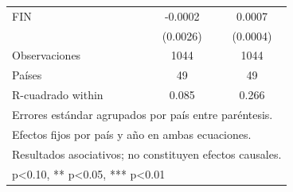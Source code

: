{\begin{tabular}{l*{2}{c}}
\addlinespace
FIN                 &     -0.0002         &      0.0007\sym{*}  \\
                    &    (0.0026)         &    (0.0004)         \\
\midrule
Observaciones       &        1044         &        1044         \\
Países              &          49         &          49         \\
R-cuadrado within   &       0.085         &       0.266         \\
\bottomrule
\multicolumn{3}{l}{\footnotesize Errores estándar agrupados por país entre paréntesis.}\\
\multicolumn{3}{l}{\footnotesize Efectos fijos por país y año en ambas ecuaciones.}\\
\multicolumn{3}{l}{\footnotesize Resultados asociativos; no constituyen efectos causales.}\\
\multicolumn{3}{l}{\footnotesize * p<0.10, ** p<0.05, *** p<0.01}\\
\end{tabular}
}

